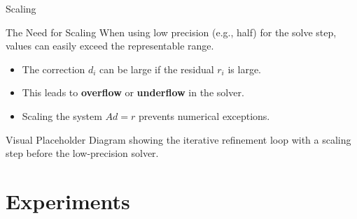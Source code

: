 \documentclass[
	11pt,
	aspectratio=169,
]{beamer}
\begin{document}
\begin{frame}{Scaling}
    \begin{block}{The Need for Scaling}
When using low precision (e.g., half) for the solve step, values can easily exceed the representable range.
\end{block}

\begin{itemize}
    \item The correction $d_i$ can be large if the residual $r_i$ is large.
    \item This leads to \textbf{overflow} or \textbf{underflow} in the solver.
    \item Scaling the system $A d = r$ prevents numerical exceptions.
\end{itemize}

\begin{alertblock}{Visual Placeholder}
Diagram showing the iterative refinement loop with a scaling step before the low-precision solver.
\end{alertblock}
\end{frame}


\section{Experiments}
\end{document}
